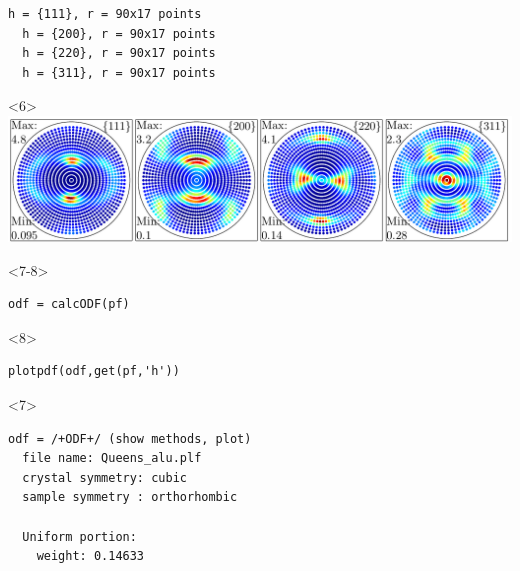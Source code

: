\documentclass[comptress]{beamer}
\begin{document}
\begin{frame}[fragile]
\begin{overlayarea}{\textwidth}{5.5cm}
\begin{onlyenv}
\begin{lstlisting}[style=output]
  h = {111}, r = 90x17 points
  h = {200}, r = 90x17 points
  h = {220}, r = 90x17 points
  h = {311}, r = 90x17 points
  \end{lstlisting}
\end{onlyenv}
\begin{onlyenv}<6>
  \includegraphics[width=\textwidth]{pic/pf}
\end{onlyenv}
\begin{onlyenv}<7-8>
  \begin{lstlisting}[style=input]
odf = calcODF(pf)
  \end{lstlisting}
\end{onlyenv}
\begin{onlyenv}<8>
  \vspace{-0.3cm}
  \begin{lstlisting}[style=input]
plotpdf(odf,get(pf,'h'))
  \end{lstlisting}
\end{onlyenv}
\begin{onlyenv}<7>
\begin{lstlisting}[style=output]
odf = /+ODF+/ (show methods, plot)
  file name: Queens_alu.plf
  crystal symmetry: cubic
  sample symmetry : orthorhombic

  Uniform portion:
    weight: 0.14633


\end{lstlisting}
\end{onlyenv}
\end{overlayarea}
\end{frame}
\end{document}
